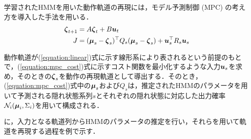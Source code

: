\documentclass[twocolumn]{preport}
\newcommand{\equref}[1]{(\ref{equation:#1})式}
\def\vector#1{\mbox{\boldmath $#1$}}
\def\vmu{\vector{\mu}}
\def\vu{\vector{u}}
\def\vzeta{\vector{\zeta}}
\begin{document}
学習されたHMMを用いた動作軌道の再現には，モデル予測制御 (MPC) の考え方を導入した手法を用いる．
\begin{align}
  \vzeta_{t+1} &= A \vzeta_{t} + B \vu_{t} \label{equation:linear} \\
  J &= (\vmu_s - \vzeta_s)^\top Q_s (\vmu_s - \vzeta_s) + \vu_s^\top R_s \vu_s \label{equation:mpc_cost}
\end{align}

動作軌道が\equref{linear}に示す線形系により表されるという前提のもとで，\equref{mpc_cost}に示すコスト関数を最小化するような入力\(\vu_s\)を求め，そのときの\(\vzeta_s\)を動作の再現軌道として導出する．そのとき，\equref{mpc_cost}中の\(\vmu_s\)および\(Q_s\)は，推定されたHMMのパラメータを用いて予測される隠れ状態系列\(s\)とそれぞれの隠れ状態に対応した出力確率\(\mathcal{N}_i(\vector{\mu}_i, \Sigma_i)\)を用いて構成される．

に，入力となる軌道列からHMMのパラメータの推定を行い，それらを用いて軌道を再現する過程を例で示す．
\end{document}
